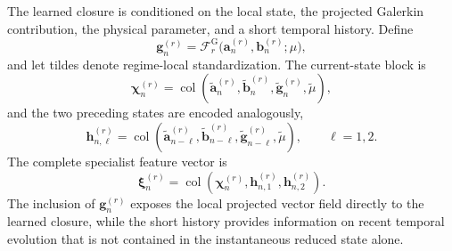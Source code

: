 The learned closure is conditioned on the local state, the projected
Galerkin contribution, the physical parameter, and a short temporal history.
Define
\begin{equation}
  \boldsymbol{g}^{(r)}_n
  =
  \mathscr{F}^{\mathrm{G}}_r
  \bigl(
    \boldsymbol{a}^{(r)}_n,
    \boldsymbol{b}^{(r)}_n;
    \mu
  \bigr),
  \label{eq:current_galerkin_feature}
\end{equation}
and let tildes denote regime-local standardization.  The current-state block
is
\begin{equation}
  \boldsymbol{\chi}^{(r)}_n
  =
  \operatorname{col}
  \left(
    \widetilde{\boldsymbol{a}}^{(r)}_n,
    \widetilde{\boldsymbol{b}}^{(r)}_n,
    \widetilde{\boldsymbol{g}}^{(r)}_n,
    \widetilde{\mu}
  \right),
  \label{eq:current_feature_block}
\end{equation}
and the two preceding states are encoded analogously,
\begin{equation}
  \boldsymbol{h}^{(r)}_{n,\ell}
  =
  \operatorname{col}
  \left(
    \widetilde{\boldsymbol{a}}^{(r)}_{n-\ell},
    \widetilde{\boldsymbol{b}}^{(r)}_{n-\ell},
    \widetilde{\boldsymbol{g}}^{(r)}_{n-\ell},
    \widetilde{\mu}
  \right),
  \qquad \ell=1,2.
  \label{eq:history_feature_block}
\end{equation}
The complete specialist feature vector is
\begin{equation}
  \boldsymbol{\xi}^{(r)}_n
  =
  \operatorname{col}
  \left(
    \boldsymbol{\chi}^{(r)}_n,
    \boldsymbol{h}^{(r)}_{n,1},
    \boldsymbol{h}^{(r)}_{n,2}
  \right).
  \label{eq:complete_specialist_features}
\end{equation}
The inclusion of $\boldsymbol{g}^{(r)}_n$ exposes the local projected vector
field directly to the learned closure, while the short history provides
information on recent temporal evolution that is not contained in the
instantaneous reduced state alone.

